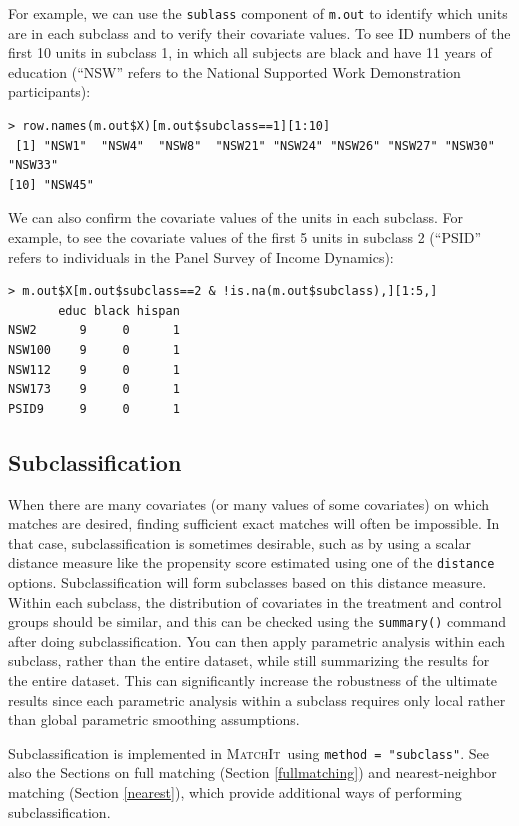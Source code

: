 \documentclass[oneside,letterpaper,titlepage]{article}
\newcommand{\MatchIt}{\textsc{MatchIt}}
\begin{document}
For example, we can use the {\tt sublass} component of {\tt m.out} to
identify which units are in each subclass and to verify their
covariate values.  To see ID numbers of the first 10 units in subclass
1, in which all subjects are black and have 11 years of education
(``NSW'' refers to the National Supported Work Demonstration
participants):
\begin{verbatim}
> row.names(m.out$X)[m.out$subclass==1][1:10]
 [1] "NSW1"  "NSW4"  "NSW8"  "NSW21" "NSW24" "NSW26" "NSW27" "NSW30" "NSW33"
[10] "NSW45"
\end{verbatim}
We can also confirm the covariate values of the units in each
subclass.  For example, to see the covariate values of the first 5
units in subclass 2 (``PSID'' refers to individuals in the Panel
Survey of Income Dynamics):
\begin{verbatim}
> m.out$X[m.out$subclass==2 & !is.na(m.out$subclass),][1:5,]
       educ black hispan
NSW2      9     0      1
NSW100    9     0      1
NSW112    9     0      1
NSW173    9     0      1
PSID9     9     0      1
\end{verbatim}

\subsection{Subclassification}
\label{subclass}

When there are many covariates (or many values of some covariates) on
which matches are desired, finding sufficient exact matches will often
be impossible.  In that case, subclassification is sometimes
desirable, such as by using a scalar distance measure like the
propensity score estimated using one of the \texttt{distance} options.
Subclassification will form subclasses based on this distance measure.
Within each subclass, the distribution of covariates in the treatment
and control groups should be similar, and this can be checked using
the \texttt{summary()} command after doing subclassification.  You can
then apply parametric analysis within each subclass, rather than the
entire dataset, while still summarizing the results for the entire
dataset.  This can significantly increase the robustness of the
ultimate results since each parametric analysis within a subclass
requires only local rather than global parametric smoothing
assumptions.

Subclassification is implemented in \MatchIt\ using \texttt{method =
  "subclass"}.  See also the Sections on full matching (Section
\ref{fullmatching}) and nearest-neighbor matching (Section
\ref{nearest}), which provide additional ways of performing
subclassification.
\end{document}

